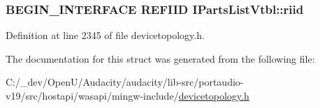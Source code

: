 \subsubsection[{\texorpdfstring{riid}{riid}}]{\setlength{\rightskip}{0pt plus 5cm}B\+E\+G\+I\+N\+\_\+\+I\+N\+T\+E\+R\+F\+A\+CE {\bf R\+E\+F\+I\+ID} I\+Parts\+List\+Vtbl\+::riid}\hypertarget{struct_i_parts_list_vtbl_a64c041e5979c2a523f9fb3580a5993f9}{}\label{struct_i_parts_list_vtbl_a64c041e5979c2a523f9fb3580a5993f9}


Definition at line 2345 of file devicetopology.\+h.



The documentation for this struct was generated from the following file\+:\begin{DoxyCompactItemize}
\item 
C\+:/\+\_\+dev/\+Open\+U/\+Audacity/audacity/lib-\/src/portaudio-\/v19/src/hostapi/wasapi/mingw-\/include/\hyperlink{devicetopology_8h}{devicetopology.\+h}\end{DoxyCompactItemize}
